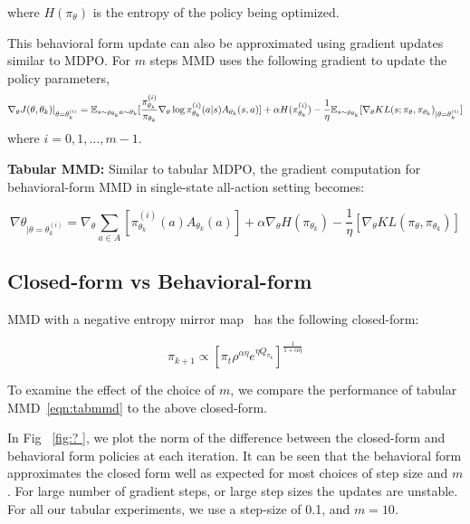 where $H(\pi_\theta)$ is the entropy of the policy being optimized.

This behavioral form update can also be approximated using gradient updates similar to MDPO.
For $m$ steps MMD uses the following gradient to update the policy parameters,
\begin{equation}
	\label{eqn:mmdgrad} \nabla_{\theta} J(\theta, \theta_k)|_{\theta = \theta_k^{(i)}} = \mathbb{E}_{s \sim
		\rho_{\theta_k} \\ a \sim \theta_k} [ \frac{ \pi_{\theta_k}^{(i)}}{ \pi_{\theta_k}} \nabla_{\theta}
		\log \pi_{\theta_k}^{(i)} (a|s) A_{\theta_k}(s,a)] + \alpha H( \pi_{\theta_k}^{(i)}) -
	\frac{1}{\eta} \mathbb{E}_{s \sim \rho_{\theta_k}} [\nabla_\theta KL(s; \pi_\theta,
		\pi_{\theta_k})_{|\theta= \theta_k^{(i)}}]
\end{equation} where $i=0,1,\ldots,m-1$.

\textbf{Tabular MMD: }
Similar to tabular MDPO, the gradient computation for behavioral-form MMD in single-state
all-action setting becomes:

\begin{equation}
	\label{eqn:tabmmd} \nabla
	\theta_{|\theta=\theta_{k}^{(i)}} = \nabla_{\theta} \sum_{a \in A} [ \pi_{\theta_k}^{(i)} (a)
		A_{\theta_k}(a)] + \alpha \nabla_{\theta} H(\pi_{\theta_k}) - \frac{1}{\eta} [\nabla_\theta
		KL(\pi_\theta, \pi_{\theta_k})]
\end{equation}

\subsection{Closed-form vs
	Behavioral-form} MMD with a negative entropy mirror map~ \cite[equation (12)]{sokotaUnified2023}
has the following closed-form:

\begin{equation}
	\label{eqn:mmdcf} \pi_{k+1}
	\propto [\pi_t \rho^{\alpha \eta} e^{\eta Q_{\pi_k}}]^{ \frac{1}{1+\alpha \eta}}
\end{equation}

To examine the effect of the choice of $m$, we compare the performance of
tabular MMD~\ref{eqn:tabmmd} to the above closed-form.

In Fig~ \ref{fig:?
}, we plot the norm of the difference between the closed-form and behavioral form policies at each iteration.
It can be seen that the behavioral form approximates the closed form well as expected for most
choices of step size and $m$.
For large number of gradient steps, or large step sizes the updates are unstable.
For all our tabular experiments, we use a step-size of 0.1, and $m=10$.

